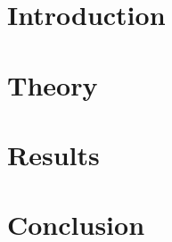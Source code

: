\documentclass[aps,pra,reprint,groupedaddress]{revtex4-2}
\begin{document}

\title{}

\author{}
\affiliation{}

\date{\today}

\begin{abstract}
\end{abstract}


\maketitle

\section{Introduction}

\section{Theory}

\section{Results}

\section{Conclusion}

\end{document}
